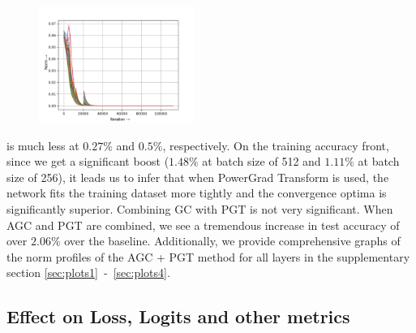 \documentclass[runningheads]{llncs}
\begin{document}
\begin{figure}
\vspace{-1cm}
\centering
\includegraphics[width=0.45\textwidth]{baseline_high_bs-w-layer2-2}
\vspace{-1.5cm}
\end{figure}

\noindent
is much less at $0.27\%$ and $0.5\%$, respectively. On the training accuracy front,
since we get a significant boost ($1.48\%$ at batch size of 512 and $1.11\%$ at batch
size of 256), it leads us to infer that when PowerGrad Transform is used, the network
fits the training dataset more tightly and the convergence optima is significantly
superior. Combining GC with PGT is not very significant. When AGC and PGT are combined,
we see a tremendous increase in test accuracy of over $2.06\%$ over the baseline.
Additionally, we provide comprehensive graphs of the norm profiles of the AGC + PGT
method for all layers in the supplementary section \ref{sec:plots1}\ -\
\ref{sec:plots4}.










\subsection{Effect on Loss, Logits and other metrics}
\label{sec:Effe}
\end{document}
